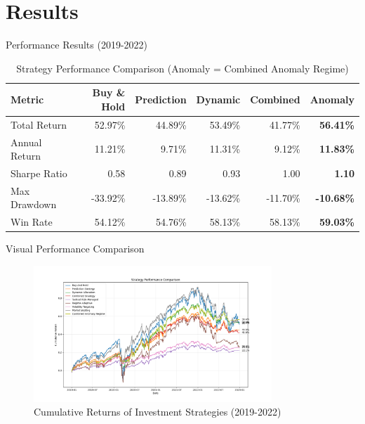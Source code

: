 \documentclass[aspectratio=169,xcolor=dvipsnames]{beamer}
\begin{document}
\section{Results}
\begin{frame}{Performance Results (2019-2022)}
    \begin{table}
        \begin{tabular}{l r r r r r}
            \toprule
            \textbf{Metric} & \textbf{Buy \& Hold} & \textbf{Prediction} & \textbf{Dynamic} & \textbf{Combined} & \textbf{Anomaly} \\
            \midrule
            Total Return & 52.97\% & 44.89\% & 53.49\% & 41.77\% & \textbf{56.41\%} \\
            Annual Return & 11.21\% & 9.71\% & 11.31\% & 9.12\% & \textbf{11.83\%} \\
            Sharpe Ratio & 0.58 & 0.89 & 0.93 & 1.00 & \textbf{1.10} \\
            Max Drawdown & -33.92\% & -13.89\% & -13.62\% & -11.70\% & \textbf{-10.68\%} \\
            Win Rate & 54.12\% & 54.76\% & 58.13\% & 58.13\% & \textbf{59.03\%} \\
            \bottomrule
        \end{tabular}
        \caption{Strategy Performance Comparison (Anomaly = Combined Anomaly Regime)}
    \end{table}
\end{frame}

\begin{frame}{Visual Performance Comparison}
    \begin{figure}
        \centering
        \includegraphics[width=0.8\textwidth]{enhanced_strategy_performance.png}
        \caption{Cumulative Returns of Investment Strategies (2019-2022)}
    \end{figure}
\end{frame}
\end{document}
